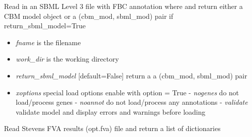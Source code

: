 \documentclass[a4paper,11pt,english]{sphinxmanual}
\begin{document}

\begin{fulllineitems}
\label{modules_doc:cbmpy.CBRead.readSBML3FBC}
Read in an SBML Level 3 file with FBC annotation where and return either a CBM model object
or a (cbm\_mod, sbml\_mod) pair if return\_sbml\_model=True
\begin{itemize}
\item {} 
\emph{fname} is the filename

\item {} 
\emph{work\_dir} is the working directory

\item {} 
\emph{return\_sbml\_model} {[}default=False{]} return a a (cbm\_mod, sbml\_mod) pair

\item {} 
\emph{xoptions} special load options enable with option = True
- \emph{nogenes} do not load/process genes
- \emph{noannot} do not load/process any annotations
- \emph{validate} validate model and display errors and warnings before loading

\end{itemize}

\end{fulllineitems}


\begin{fulllineitems}
\label{modules_doc:cbmpy.CBRead.readSK_FVA}
Read Stevens FVA results (opt.fva) file and return a list of dictionaries

\end{fulllineitems}

\end{document}

